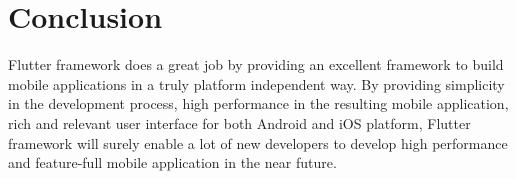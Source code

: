 \chapter{Conclusion}

Flutter framework does a great job by providing an excellent framework to build mobile applications in a truly platform independent way. By providing simplicity in the development process, high performance in the resulting mobile application, rich and relevant user interface for both Android and iOS platform, Flutter framework will surely enable a lot of new developers to develop high performance and feature-full mobile application in the near future.
